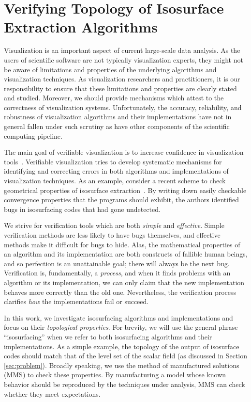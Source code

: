 \chapter{Verifying Topology of Isosurface Extraction Algorithms}\label{chap:topology}

Visualization is an important aspect of current large-scale
data analysis.
%
As the users of scientific software are not typically visualization
experts,
%
they might not be aware of limitations
and properties of the underlying algorithms and visualization
techniques.
%
As visualization researchers and practitioners, it is our responsibility to
ensure that these limitations and properties are clearly stated and studied.
%
Moreover, we should provide mechanisms which attest to the correctness of 
visualization systems.
%
Unfortunately, the accuracy, reliability, and robustness of visualization
algorithms and their implementations have not in general fallen under
such scrutiny as have other components of the scientific computing
pipeline.
%

The main goal of verifiable visualization is to increase confidence in
visualization tools~\cite{kirby-vv-08}.
Verifiable visualization tries to develop systematic mechanisms for
identifying and correcting errors in both algorithms and
implementations of visualization techniques.  As an example, consider
a recent scheme to check geometrical properties of isosurface
extraction~\cite{etiene:tvcg:2009}.  By writing down easily checkable
convergence properties that the programs should exhibit, the authors
identified bugs in isosurfacing codes that had gone undetected.

We strive for verification tools which are both \emph{simple} and
\emph{effective}. Simple verification methods are less likely to have
bugs themselves, and effective methods make it difficult for bugs to
hide.  Alas, the mathematical properties of an algorithm and its
implementation are both constructs of fallible human beings, and so
perfection is an unattainable goal; there will always be the next
bug. Verification is, fundamentally, a \emph{process}, and when it
finds problems with an algorithm or its implementation, we can only
claim that the new implementation behaves more correctly than the old
one.  Nevertheless, the verification process clarifies \emph{how} the
implementations fail or succeed.

In this work, we investigate isosurfacing algorithms and
implementations and focus on their \emph{topological properties}. For
brevity, we will use the general phrase ``isosurfacing'' when we refer
to both isosurfacing algorithms and their implementations.
%
As a simple example, the topology of the output of isosurface codes
should match that of the level set of the scalar field (as discussed
in Section \ref{sec:problem}).
%
Broadly speaking, we use the method of manufactured solutions (MMS) to
check these properties.
%
By manufacturing a model whose known behavior should be reproduced by
the techniques under analysis, MMS can check whether they meet
expectations.

